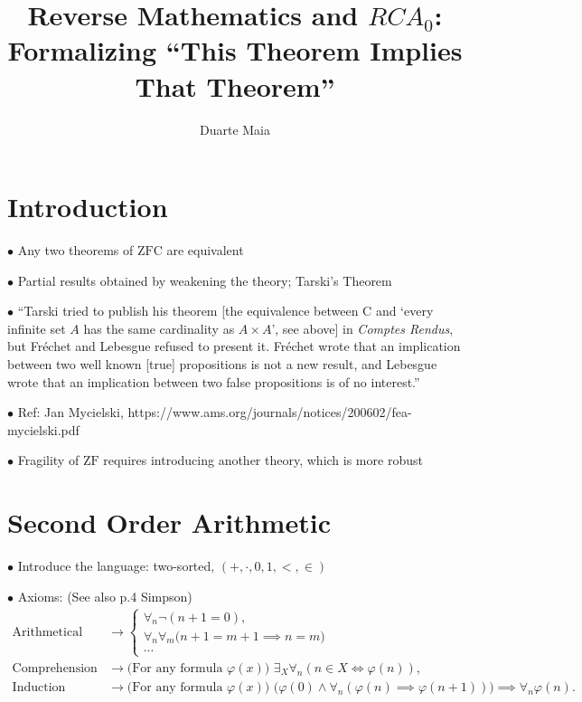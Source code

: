 \documentclass{article}
\title{Reverse Mathematics and $RCA_0$: Formalizing ``This Theorem Implies That Theorem''}
\author{Duarte Maia}
\theoremstyle{nonumberplain}
\newcommand{\ZFC}{\mathrm{ZFC}}
\newcommand{\ZF}{\mathrm{ZF}}
\newcommand{\Choice}{\mathrm{C}}
\newcommand\point[1]{\noindent \hspace{\labelsep} $\bullet$ #1 \smallskip}
\begin{document}
\maketitle

\section{Introduction}

\point{Any two theorems of $\ZFC$ are equivalent}

\point{Partial results obtained by weakening the theory; Tarski's Theorem}

\point{``Tarski tried to publish his theorem [the equivalence between $\Choice$ and `every infinite set $A$ has the same cardinality as $A \times A$', see above] in \textit{Comptes Rendus}, but Fréchet and Lebesgue refused to present it. Fréchet wrote that an implication between two well known [true] propositions is not a new result, and Lebesgue wrote that an implication between two false propositions is of no interest.''}

\point{Ref: Jan Mycielski, https://www.ams.org/journals/notices/200602/fea-mycielski.pdf}

\point{Fragility of $\ZF$ requires introducing another theory, which is more robust}

\section{Second Order Arithmetic}

\point{Introduce the language: two-sorted, $(+,\cdot,0,1,<,\in)$}

\point{Axioms: (See also p.4 Simpson)}
\begin{equation}
\begin{aligned}
\text{Arithmetical Axioms} &\rightarrow \begin{cases}
\forall_n \neg (n+1 = 0),\\
\forall_n \forall_m \big( n+1 = m+1 \implies n=m \big)\\
\cdots
\end{cases}\\
\text{Comprehension} &\rightarrow \text{(For any formula $\varphi(x)$) } \exists_X \forall_n (n \in X \iff \varphi(n)),\\
\text{Induction} &\rightarrow \text{(For any formula $\varphi(x)$) } \big(\varphi(0) \land \forall_n (\varphi(n) \implies \varphi(n+1)) \big) \implies \forall_n \varphi(n).
\end{aligned}
\end{equation}
\end{document}
